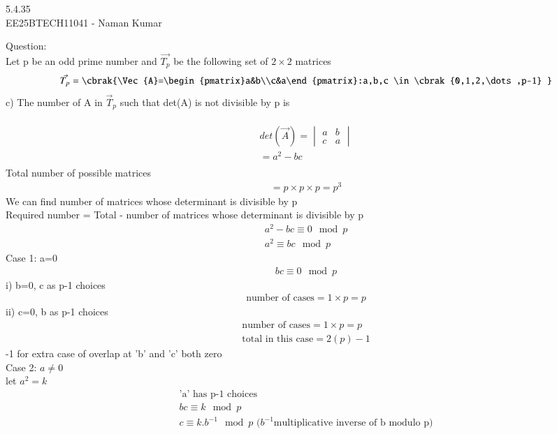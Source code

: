 \documentclass[journal]{IEEEtran}
\author{EE25BTECH11041-Naman Kumar }
\begin{document}
\begin{center}
    \huge{5.4.35}\\
    \large{EE25BTECH11041 - Naman Kumar}
\end{center}
Question:\\
Let p be an odd prime number and $\vec{T_p}$ be the following set of $2\times2$ matrices
\begin{align}
\vec{T_p}=\cbrak{\Vec{A}=\begin{pmatrix}a&b\\c&a\end{pmatrix}:a,b,c \in \cbrak{0,1,2,\dots,p-1} }
\end{align}
c) The number of A in $\vec{T}_p$ such that det(A) is not divisible by p is\\
\solution \\
\begin{align}
    det(\vec{A})=\begin{vmatrix}a&b\\c&a\end{vmatrix}\\
    =a^2-bc\\
\end{align}
Total number of possible matrices
\begin{align}
    =p\times p \times p=p^3
\end{align}
We can find number of matrices whose determinant is divisible by p\\
Required number = Total - number of matrices whose determinant is divisible by p
\begin{align}
    a^2-bc \equiv 0 \mod p \\
    a^2\equiv bc \mod p
\end{align}
Case 1: a=0
\begin{align}
    bc \equiv 0 \mod p
\end{align}
i) b=0, c as p-1 choices
\begin{align}
    \text{number of cases} = 1\times p=p
\end{align}
ii) c=0, b as p-1 choices
\begin{align}
    \text{number of cases} = 1\times p=p\\
    \text{total in this case}= 2(p)-1\label{1}
\end{align}
-1 for extra case of overlap at 'b' and 'c' both zero\\
Case 2: $a\neq0$\\
let $a^2=k$
\begin{align}
    \text{'a' has p-1 choices}\\
    bc \equiv k \mod p\\
    c\equiv k.b^{-1} \mod p \text{ ($b^{-1}$multiplicative inverse of b modulo p)}
\end{align}
\end{document}
